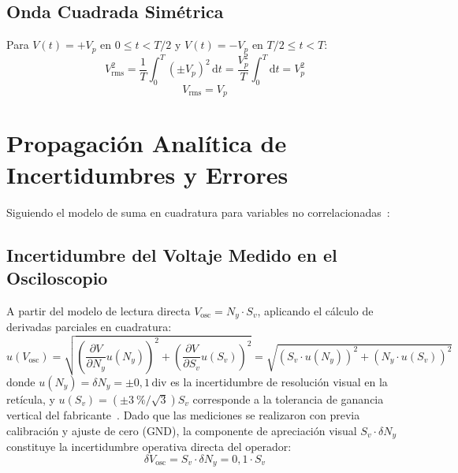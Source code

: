 \begin{appendices}
\subsection{Onda Cuadrada Simétrica}
Para $V(t) = +V_p$ en $0 \le t < T/2$ y $V(t) = -V_p$ en $T/2 \le t < T$:
\begin{equation}
    V_{\text{rms}}^2 = \frac{1}{T} \int_0^T (\pm V_p)^2\,\mathrm{d}t = \frac{V_p^2}{T} \int_0^T \mathrm{d}t = V_p^2
\end{equation}
\begin{equation}
    \boxed{V_{\text{rms}} = V_p} \label{eq:anexo_rms_cuad}
\end{equation}

\section{Propagación Analítica de Incertidumbres y Errores}
\label{anexo:propagacion_errores}

Siguiendo el modelo de suma en cuadratura para variables no correlacionadas~\cite{taylor, gum}:

\subsection{Incertidumbre del Voltaje Medido en el Osciloscopio}
A partir del modelo de lectura directa $V_{\text{osc}} = N_y \cdot S_v$, aplicando el cálculo de derivadas parciales en cuadratura:
\begin{equation}
    u(V_{\text{osc}}) = \sqrt{\left(\frac{\partial V}{\partial N_y} u(N_y)\right)^2 + \left(\frac{\partial V}{\partial S_v} u(S_v)\right)^2} = \sqrt{\left(S_v \cdot u(N_y)\right)^2 + \left(N_y \cdot u(S_v)\right)^2}
\end{equation}
donde $u(N_y) = \delta N_y = \pm 0{,}1\,\text{div}$ es la incertidumbre de resolución visual en la retícula, y $u(S_v) = (\pm\qty{3}{\percent}/\sqrt{3}) S_v$ corresponde a la tolerancia de ganancia vertical del fabricante~\cite{rs_rtc1000_specs}. Dado que las mediciones se realizaron con previa calibración y ajuste de cero ($\text{GND}$), la componente de apreciación visual $S_v \cdot \delta N_y$ constituye la incertidumbre operativa directa del operador:
\begin{equation}
    \boxed{\delta V_{\text{osc}} = S_v \cdot \delta N_y = 0{,}1 \cdot S_v}
\end{equation}


\end{appendices}
